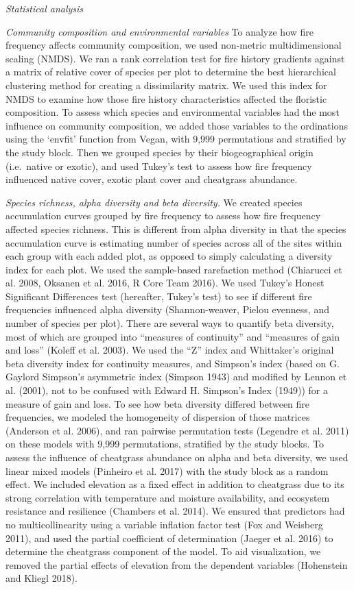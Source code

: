 \documentclass[12pt,]{article}
\begin{document}
\emph{Statistical analysis}

\emph{Community composition and environmental variables} To analyze how
fire frequency affects community composition, we used non-metric
multidimensional scaling (NMDS). We ran a rank correlation test for fire
history gradients against a matrix of relative cover of species per plot
to determine the best hierarchical clustering method for creating a
dissimilarity matrix. We used this index for NMDS to examine how those
fire history characteristics affected the floristic composition. To
assess which species and environmental variables had the most influence
on community composition, we added those variables to the ordinations
using the `envfit' function from Vegan, with 9,999 permutations and
stratified by the study block. Then we grouped species by their
biogeographical origin (i.e.~native or exotic), and used Tukey's test to
assess how fire frequency influenced native cover, exotic plant cover
and cheatgrass abundance.

\emph{Species richness, alpha diversity and beta diversity.} We created
species accumulation curves grouped by fire frequency to assess how fire
frequency affected species richness. This is different from alpha
diversity in that the species accumulation curve is estimating number of
species across all of the sites within each group with each added plot,
as opposed to simply calculating a diversity index for each plot. We
used the sample-based rarefaction method (Chiarucci et al. 2008, Oksanen
et al. 2016, R Core Team 2016). We used Tukey's Honest Significant
Differences test (hereafter, Tukey's test) to see if different fire
frequencies influenced alpha diversity (Shannon-weaver, Pielou evenness,
and number of species per plot). There are several ways to quantify beta
diversity, most of which are grouped into ``measures of continuity'' and
``measures of gain and loss'' (Koleff et al. 2003). We used the ``Z''
index and Whittaker's original beta diversity index for continuity
measures, and Simpson's index (based on G. Gaylord Simpson's asymmetric
index (Simpson 1943) and modified by Lennon et al. (2001), not to be
confused with Edward H. Simpson's Index (1949)) for a measure of gain
and loss. To see how beta diversity differed between fire frequencies,
we modeled the homogeneity of dispersion of those matrices (Anderson et
al. 2006), and ran pairwise permutation tests (Legendre et al. 2011) on
these models with 9,999 permutations, stratified by the study blocks. To
assess the influence of cheatgrass abundance on alpha and beta
diversity, we used linear mixed models (Pinheiro et al. 2017) with the
study block as a random effect. We included elevation as a fixed effect
in addition to cheatgrass due to its strong correlation with temperature
and moisture availability, and ecosystem resistance and resilience
(Chambers et al. 2014). We ensured that predictors had no
multicollinearity using a variable inflation factor test (Fox and
Weisberg 2011), and used the partial coefficient of determination
(Jaeger et al. 2016) to determine the cheatgrass component of the model.
To aid visualization, we removed the partial effects of elevation from
the dependent variables (Hohenstein and Kliegl 2018).
\end{document}
